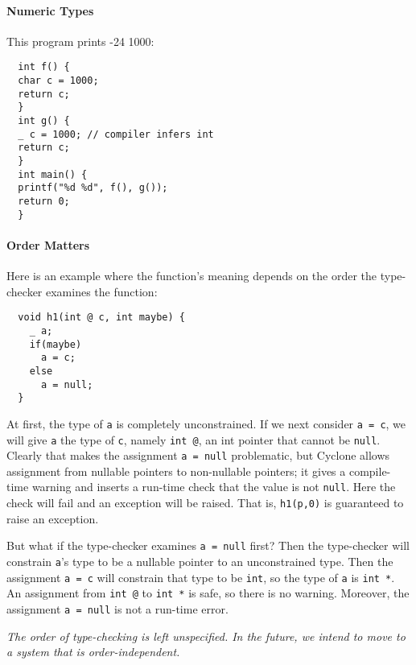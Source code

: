 \paragraph{Numeric Types} This program prints -24 1000:
\begin{verbatim}
  int f() {
  char c = 1000;
  return c;
  }
  int g() {
  _ c = 1000; // compiler infers int
  return c;
  }
  int main() {
  printf("%d %d", f(), g());
  return 0;
  }
\end{verbatim}

\paragraph{Order Matters}
Here is an example where the function's meaning depends on the order
the type-checker examines the function:
\begin{verbatim}
  void h1(int @ c, int maybe) {
    _ a;
    if(maybe)
      a = c;
    else
      a = null;
  }
\end{verbatim}
At first, the type of \texttt{a} is completely unconstrained.  If we
next consider \texttt{a = c}, we will give \texttt{a} the type of
\texttt{c}, namely \texttt{int @}, an int pointer that cannot be
\texttt{null}.  Clearly that makes the assignment \texttt{a = null}
problematic, but Cyclone allows assignment from nullable pointers to
non-nullable pointers; it gives a compile-time warning and inserts a
run-time check that the value is not \texttt{null}.  Here the check will
fail and an exception will be raised.  That is, \texttt{h1(p,0)} is
guaranteed to raise an exception.

But what if the type-checker examines \texttt{a = null} first?  Then the
type-checker will constrain \texttt{a}'s type to be a nullable pointer
to an unconstrained type.  Then the assignment \texttt{a = c} will
constrain that type to be \texttt{int}, so the type of \texttt{a} is
\texttt{int *}.  An assignment from \texttt{int @} to \texttt{int *} is
safe, so there is no warning.  Moreover, the assignment \texttt{a = null} is
not a run-time error.

\emph{The order of type-checking is left unspecified.  In the future,
  we intend to move to a system that is order-independent.}

